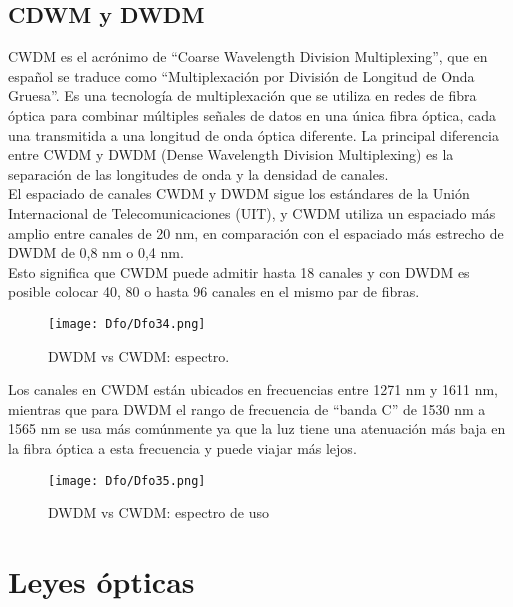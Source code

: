 \documentclass[
	12pt, %
	fleqn, %
	a4paper, %
	oneside, %
]{LegrandOrangeBook}
\begin{document}
\subsection{CDWM y DWDM}
CWDM es el acrónimo de ``Coarse Wavelength Division Multiplexing'', que en español se traduce como ``Multiplexación por División de Longitud de Onda Gruesa''. Es una tecnología de multiplexación que se utiliza en redes de fibra óptica para combinar múltiples señales de datos en una única fibra óptica, cada una transmitida a una longitud de onda óptica diferente. La principal diferencia entre CWDM y DWDM (Dense Wavelength Division Multiplexing) es la separación de las longitudes de onda y la densidad de canales.\\
El espaciado de canales CWDM y DWDM sigue los estándares de la Unión Internacional de Telecomunicaciones (UIT), y CWDM utiliza un espaciado más amplio entre canales de 20 nm, en comparación con el espaciado más estrecho de DWDM de 0,8 nm o 0,4 nm.\\
Esto significa que CWDM puede admitir hasta 18 canales y con DWDM es posible colocar 40, 80 o hasta 96 canales en el mismo par de fibras.
\begin{figure}[H]
\centering
\texttt{[image: Dfo/Dfo34.png]}
\caption{DWDM vs CWDM: espectro.}
\end{figure}
Los canales en CWDM están ubicados en frecuencias entre 1271 nm y 1611 nm, mientras que para DWDM el rango de frecuencia de ``banda C'' de 1530 nm a 1565 nm se usa más comúnmente ya que la luz tiene una atenuación más baja en la fibra óptica a esta frecuencia y puede viajar más lejos.
\begin{figure}[H]
\centering
\texttt{[image: Dfo/Dfo35.png]}
\caption{DWDM vs CWDM: espectro de uso}
\end{figure}
\section{Leyes ópticas}
\end{document}
